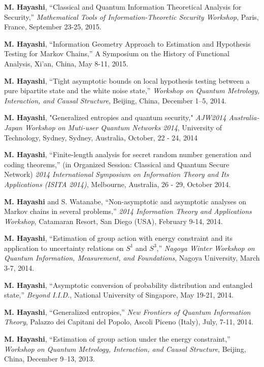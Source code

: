 \documentclass[a4paper,12pt,oneside]{article}
\begin{document}
\begin{enumerate}
\textbf{M. Hayashi}, ``Classical and Quantum Information Theoretical Analysis for Security,'' 
{\em Mathematical Tools of Information-Theoretic Security Workshop}, Paris, France, September 23-25, 2015.



\textbf{M. Hayashi},
``Information Geometry Approach to Estimation and Hypothesis Testing for Markov Chains,'' 
A Symposium on the History of Functional Analysis, Xi'an, 
China, May 8-11, 2015. 

\textbf{M. Hayashi}, 
``Tight asymptotic bounds on local hypothesis testing between a pure bipartite state and the white noise state,''
{\em Workshop on Quantum Metrology, Interaction, and Causal Structure},
Beijing, China, December 1--5, 2014. 

\textbf{M. Hayashi}, 
"Generalized entropies and quantum security," 
{\em AJW2014 Australia-Japan Workshop on Muti-user Quantum Networks 2014}, University of Technology, Sydney, Sydney, Australia, 
October, 22 - 24, 2014

\textbf{M. Hayashi},
``Finite-length analysis for secret random number generation and coding theorems,'' 
(in Organized Session: Classical and Quantum Secure Network) 
{\em 2014 International Symposium on Information Theory and Its Applications (ISITA 2014)}, Melbourne, Australia, 26 - 29, October 2014.

\textbf{M. Hayashi} and S. Watanabe, 
``Non-asymptotic and asymptotic analyses on Markov chains in several problems,'' 
{\em 2014 Information Theory and Applications Workshop}, 
Catamaran Resort, San Diego (USA), February 9-14, 2014.

\textbf{M. Hayashi}, 
``Estimation of group action with energy constraint and its application to uncertainty relations on $S^1$ and $S^3$,'' 
{\em Nagoya Winter Workshop on Quantum Information, Measurement, and Foundations}, 
Nagoya University, March 3-7, 2014.

\textbf{M. Hayashi}, 
``Asymptotic conversion of probability distribution and entangled state,'' {\em Beyond I.I.D.}, National University of Singapore, May 19-21, 2014.

\textbf{M. Hayashi}, 
``Generalized entropies,''
{\em New Frontiers of Quantum Information Theory}, 
Palazzo dei Capitani del Popolo, Ascoli Piceno (Italy),  July, 7-11, 2014.


\textbf{M. Hayashi}, 
``Estimation of group action under the energy constraint,''
{\em Workshop on Quantum Metrology, Interaction, and Causal Structure},
Beijing, China, December 9--13, 2013. 


\end{enumerate}
\end{document}
